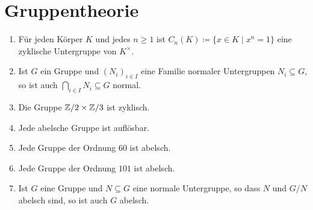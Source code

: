 \section{Gruppentheorie}


\begin{question}[subtitle = Wahr oder Falsch?]
  \begin{enumerate}
    \item
      Für jeden Körper $K$ und jedes $n \geq 1$ ist $C_n(K) \coloneqq \{x \in K \mid x^n = 1\}$ eine zyklische Untergruppe von $K^\times$.
    \item
      Ist $G$ ein Gruppe und $(N_i)_{i \in I}$ eine Familie normaler Untergruppen $N_i \subseteq G$, so ist auch $\bigcap_{i \in I} N_i \subseteq G$ normal.
    \item
      Die Gruppe $\mathbb{Z}/2 \times \mathbb{Z}/3$ ist zyklisch.
    \item
      Jede abelsche Gruppe ist auflösbar.
    \item
      Jede Gruppe der Ordnung $60$ ist abelsch.
    \item
      Jede Gruppe der Ordnung $101$ ist abelsch.
    \item
      Ist $G$ eine Gruppe und $N \subseteq G$ eine normale Untergruppe, so dass $N$ und $G/N$ abelsch sind, so ist auch $G$ abelsch.
  \end{enumerate}
\end{question}


